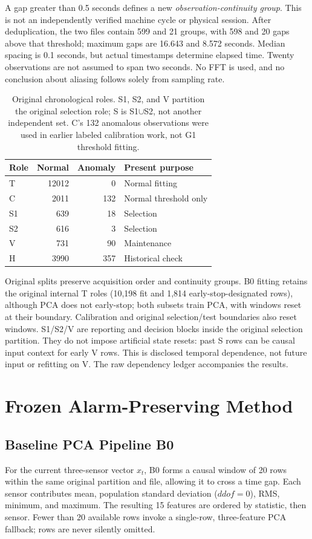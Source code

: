 \documentclass{article}
\begin{document}
A gap greater than 0.5 seconds defines a new \emph{observation-continuity group}. This is not an independently verified machine cycle or physical session. After deduplication, the two files contain 599 and 21 groups, with 598 and 20 gaps above that threshold; maximum gaps are 16.643 and 8.572 seconds. Median spacing is 0.1 seconds, but actual timestamps determine elapsed time. Twenty observations are not assumed to span two seconds. No FFT is used, and no conclusion about aliasing follows solely from sampling rate.

\begin{table}[t]
\caption{Original chronological roles. S1, S2, and V partition the original selection role; S is S1$\cup$S2, not another independent set. C's 132 anomalous observations were used in earlier labeled calibration work, not G1 threshold fitting.}
\label{tab:data}
\centering\small
\begin{tabular}{lrrl}\toprule
Role & Normal & Anomaly & Present purpose\\\midrule
T & 12012 & 0 & Normal fitting\\
C & 2011 & 132 & Normal threshold only\\
S1 & 639 & 18 & Selection\\
S2 & 616 & 3 & Selection\\
V & 731 & 90 & Maintenance\\
H & 3990 & 357 & Historical check\\\bottomrule
\end{tabular}
\end{table}

Original splits preserve acquisition order and continuity groups. B0 fitting retains the original internal T roles (10,198 fit and 1,814 early-stop-designated rows), although PCA does not early-stop; both subsets train PCA, with windows reset at their boundary. Calibration and original selection/test boundaries also reset windows. S1/S2/V are reporting and decision blocks inside the original selection partition. They do not impose artificial state resets: past S rows can be causal input context for early V rows. This is disclosed temporal dependence, not future input or refitting on V. The raw dependency ledger accompanies the results.

\section{Frozen Alarm-Preserving Method}
\subsection{Baseline PCA Pipeline B0}
For the current three-sensor vector $x_t$, B0 forms a causal window of 20 rows within the same original partition and file, allowing it to cross a time gap. Each sensor contributes mean, population standard deviation ($ddof=0$), RMS, minimum, and maximum. The resulting 15 features are ordered by statistic, then sensor. Fewer than 20 available rows invoke a single-row, three-feature PCA fallback; rows are never silently omitted.
\end{document}
